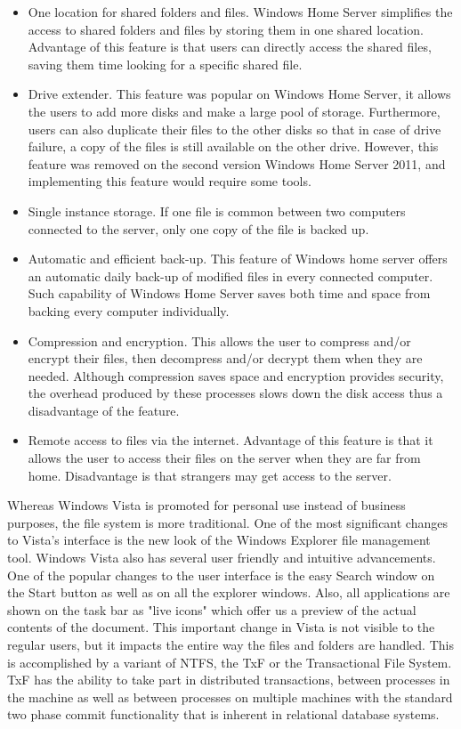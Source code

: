 \documentclass[a4paper, 12pt]{article}
\begin{document}
\begin{itemize}
    \item One location for shared folders and files. Windows Home Server simplifies the access to shared folders and files by storing them in one shared location. Advantage of this feature is that users can directly access the shared files, saving them time looking for a specific shared file. 
    \item Drive extender. This feature was popular on Windows Home Server, it allows the users to add more disks and make a large pool of storage. Furthermore, users can also duplicate their files to the other disks so that in case of drive failure, a copy of the files is still available on the other drive. However, this feature was removed on the second version Windows Home Server 2011, and implementing this feature would require some tools. 
    \item Single instance storage. If one file is common between two computers connected to the server, only one copy of the file is backed up. 
    \item Automatic and  efficient back-up. This feature of Windows home server offers an automatic daily back-up of modified files in every connected computer. Such capability of Windows Home Server saves both time and space from backing every computer individually. 
    \item Compression and encryption. This allows the user to compress and/or encrypt their files, then decompress and/or decrypt them when they are needed. Although compression saves space and encryption provides security, the overhead produced by these processes slows down the disk access thus a disadvantage of the feature. 
    \item Remote access to files via the internet. Advantage of this feature is that it allows the user to access their files on the server when they are far from home. Disadvantage is that strangers may get access to the server. 
\end{itemize}

Whereas Windows Vista is promoted for personal use instead of business purposes, the file system is more traditional. One of the most significant changes to Vista’s interface is the new look of the Windows Explorer file management tool. Windows Vista also has several user friendly and intuitive advancements. One of the popular changes to the user interface is the easy Search window on the Start button as well as on all the explorer windows. Also, all applications are shown on the task bar as "live icons" which offer us a preview of the actual contents of the document. This important change in Vista is not visible to the regular users, but it impacts the entire way the files and folders are handled. This is accomplished by a variant of NTFS, the TxF or the Transactional File System. TxF has the ability to take part in distributed transactions, between processes in the machine as well as between processes on multiple machines with the standard two phase commit functionality that is inherent in relational database systems.
\end{document}
